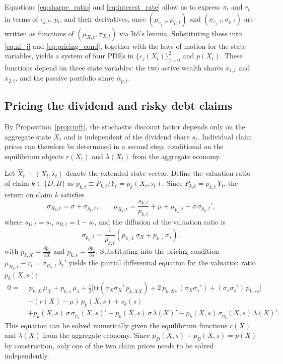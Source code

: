 \documentclass[12pt,english]{article}
\begin{document}
Equations \eqref{eq:sharpe_ratio} and \eqref{eq:interest_rate} allow us to express $\pi_t$ and $r_t$ in terms of $c_{j,t}$, $p_t$, and their derivatives, once $(\mu_{c_j,t}, \mu_{p,t})$ and $(\sigma_{c_j,t}, \sigma_{p,t})$ are written as functions of $(\mu_{X,t}, \sigma_{X,t})$ via It\^{o}'s lemma. Substituting these into \eqref{eq:xi_j} and \eqref{eq:pricing_cond}, together with the laws of motion for the state variables, yields a system of four PDEs in $\{c_j(X_t)\}_{j=0}^2$ and $p(X_t)$. These functions depend on three state variables: the two active wealth shares $x_{1,t}$ and $x_{2,t}$, and the passive portfolio share $\overline{\alpha}_{p,t}$.  


\subsection{Pricing the dividend and risky debt claims}\label{sec:pricing_claims}

By Proposition~\ref{prop:mft}, the stochastic discount factor depends only on the aggregate state $X_t$ and is independent of the dividend share $s_t$. Individual claim prices can therefore be determined in a second step, conditional on the equilibrium objects $r(X_t)$ and $\lambda(X_t)$ from the aggregate economy.

Let $\hat{X}_t = (X_t, s_t)$ denote the extended state vector. Define the valuation ratio of claim $k \in \{D,B\}$ as $p_{k,t} \equiv P_{k,t}/Y_t = p_k(X_t,s_t)$. Since $P_{k,t} = p_{k,t}\,Y_t$, the return on claim $k$ satisfies
\begin{equation}
    \sigma_{R_k,t} = \sigma + \sigma_{p_k,t}, \qquad 
    \mu_{R_k,t} = \frac{s_{k,t}}{p_{k,t}} + \mu + \mu_{p_k,t} + \sigma\,\sigma_{p_k,t}',
\end{equation}
where $s_{D,t} = s_t$, $s_{B,t} = 1-s_t$, and the diffusion of the valuation ratio is
\begin{equation}
    \sigma_{p_k,t} = \frac{1}{p_{k,t}}\!\left(p_{k,X}\,\sigma_X + p_{k,s}\,\sigma_s\right),
\end{equation}
with $p_{k,X} \equiv \frac{\partial p_k}{\partial X}$ and $p_{k,s} \equiv \frac{\partial p_k}{\partial s}$. Substituting into the pricing condition $\mu_{R_k,t} - r_t = \sigma_{R_k,t}\,\lambda_t'$ yields the partial differential equation for the valuation ratio $p_k(X,s)$:
\begin{align}\label{eq:pde_claim}
0 =\;&\, p_{k,X}\,\mu_X + p_{k,s}\,\mu_s 
+ \frac{1}{2}\Big[\mathrm{tr}\!\left(\sigma_X\sigma_X'\,p_{k,XX}\right) + 2\,p_{k,Xs}\,(\sigma_X\sigma_s') + (\sigma_s\sigma_s')\,p_{k,ss}\Big] \nonumber\\
&- (r(X)-\mu)\,p_k(X,s) + s_k(s) \nonumber\\
&+ p_k(X,s)\,\sigma\,\sigma_{p_k}(X,s)' - p_k(X,s)\,\sigma\,\lambda(X)' - p_k(X,s)\,\sigma_{p_k}(X,s)\,\lambda(X)'.
\end{align}
This equation can be solved numerically given the equilibrium functions $r(X)$ and $\lambda(X)$ from the aggregate economy. Since $p_{D}(X,s) + p_{B}(X,s) = p(X)$ by construction, only one of the two claim prices needs to be solved independently.
\end{document}
